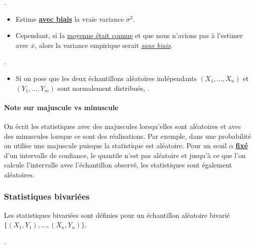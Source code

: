 \documentclass[french]{article}
\begin{document}
\begin{multicols*}{2}
\begin{definitionNOHFILLprop}
.

\begin{itemize}
	\item	Estime \underline{\textbf{avec biais}} la vraie variance $\sigma^{2}$.
	\item	Cependant, si la \underline{moyenne était connue} et que nous n'avions pas à l'estimer avec $\bar{x}$, alors la variance empirique serait \textit{\underline{sans biais}}.
\end{itemize}
\end{definitionNOHFILLprop}

\begin{definitionNOHFILLprop}[Statistique $F$]
.

\begin{itemize}
	\item	Si on pose que les deux échantillons aléatoires indépendants $(X_{1}, \dots, X_{n})$ et $(Y_{1}, \dots, Y_{m})$ sont normalement distribués, .
\end{itemize}
\end{definitionNOHFILLprop}

\paragraph{Note sur majuscule vs minuscule}	On écrit les statistiques avec des majuscules lorsqu'elles sont aléatoires et avec des minuscules lorsque ce sont des réalisations. Par exemple, dans une probabilité on utilise une majuscule puisque la statistique est aléatoire. 
Pour un seuil $\alpha$ \textbf{\underline{fixé}} d'un intervalle de confiance, le quantile n'est pas aléatoire et jusqu'à ce que l'on calcule l'intervalle avec l'échantillon observé, les statistiques sont également aléatoires. 


\subsubsection{Statistiques bivariées}
Les statistiques bivariées sont définies pour un échantillon aléatoire bivarié $\{(X_{1}, Y_{1}), \dots, (X_{n}, Y_{n})\}$.

\begin{definitionNOHFILLprop}
.


\end{definitionNOHFILLprop}
\end{multicols*}
\end{document}
